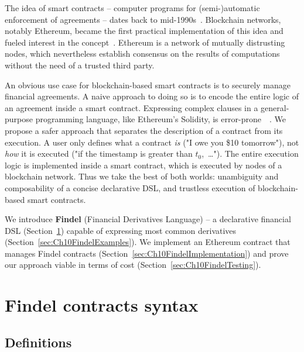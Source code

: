 The idea of smart contracts -- computer programs for (semi-)automatic enforcement of agreements -- dates back to mid-1990s~\cite{Szabo1997}.
Blockchain networks, notably Ethereum, became the first practical implementation of this idea and fueled interest in the concept~\cite{Castillo2016}.
Ethereum is a network of mutually distrusting nodes, which nevertheless establish consensus on the results of computations without the need of a trusted third party.

An obvious use case for blockchain-based smart contracts is to securely manage financial agreements.
A naive approach to doing so is to encode the entire logic of an agreement inside a smart contract.
Expressing complex clauses in a general-purpose programming language, like Ethereum's Solidity, is error-prone~\cite{Atzei2017}~\cite{Sirer2016}.
We propose a safer approach that separates the description of a contract from its execution.
A user only defines what a contract \textit{is} ("I owe you \$10 tomorrow"), not \textit{how} it is executed ("if the timestamp is greater than $t_0$,~\dots").
The entire execution logic is implemented inside a smart contract, which is executed by nodes of a blockchain network.
Thus we take the best of both worlds: unambiguity and composability of a concise declarative DSL, and trustless execution of blockchain-based smart contracts.

We introduce \textbf{Findel} (Financial Derivatives Language) -- a declarative financial DSL (Section~\ref{sec:Ch10FindelSyntax}) capable of expressing most common derivatives (Section~\ref{sec:Ch10FindelExamples}).
We implement an Ethereum contract that manages Findel contracts (Section~\ref{sec:Ch10FindelImplementation}) and prove our approach viable in terms of cost (Section~\ref{sec:Ch10FindelTesting}).


\section{Findel contracts syntax} \label{sec:Ch10FindelSyntax}

\subsection{Definitions} \label{sec:Ch10FindelDefinitions}

